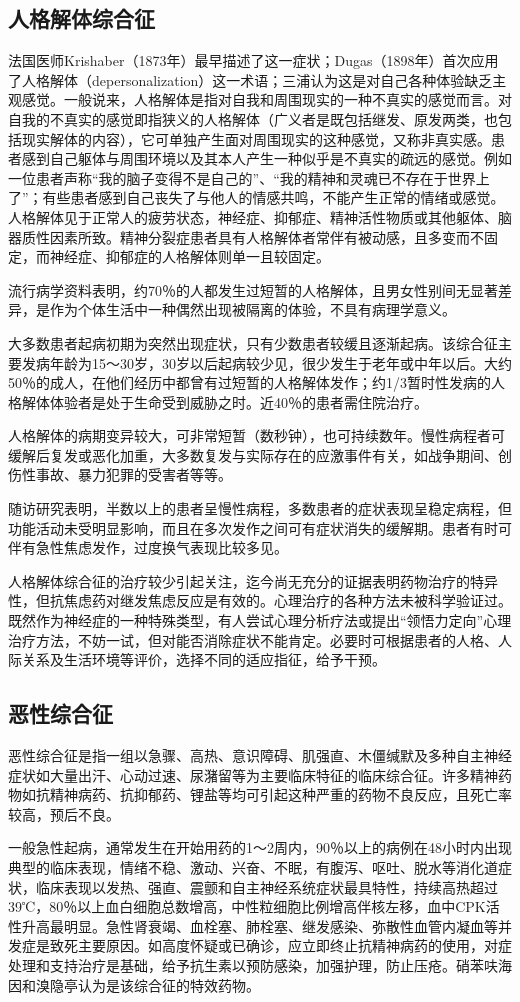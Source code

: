 \subsection{人格解体综合征}

法国医师Krishaber（1873年）最早描述了这一症状；Dugas（1898年）首次应用了人格解体（depersonalization）这一术语；三浦认为这是对自己各种体验缺乏主观感觉。一般说来，人格解体是指对自我和周围现实的一种不真实的感觉而言。对自我的不真实的感觉即指狭义的人格解体（广义者是既包括继发、原发两类，也包括现实解体的内容），它可单独产生面对周围现实的这种感觉，又称非真实感。患者感到自己躯体与周围环境以及其本人产生一种似乎是不真实的疏远的感觉。例如一位患者声称``我的脑子变得不是自己的''、``我的精神和灵魂已不存在于世界上了''；有些患者感到自己丧失了与他人的情感共鸣，不能产生正常的情绪或感觉。人格解体见于正常人的疲劳状态，神经症、抑郁症、精神活性物质或其他躯体、脑器质性因素所致。精神分裂症患者具有人格解体者常伴有被动感，且多变而不固定，而神经症、抑郁症的人格解体则单一且较固定。

流行病学资料表明，约70％的人都发生过短暂的人格解体，且男女性别间无显著差异，是作为个体生活中一种偶然出现被隔离的体验，不具有病理学意义。

大多数患者起病初期为突然出现症状，只有少数患者较缓且逐渐起病。该综合征主要发病年龄为15～30岁，30岁以后起病较少见，很少发生于老年或中年以后。大约50％的成人，在他们经历中都曾有过短暂的人格解体发作；约1/3暂时性发病的人格解体体验者是处于生命受到威胁之时。近40％的患者需住院治疗。

人格解体的病期变异较大，可非常短暂（数秒钟），也可持续数年。慢性病程者可缓解后复发或恶化加重，大多数复发与实际存在的应激事件有关，如战争期间、创伤性事故、暴力犯罪的受害者等等。

随访研究表明，半数以上的患者呈慢性病程，多数患者的症状表现呈稳定病程，但功能活动未受明显影响，而且在多次发作之间可有症状消失的缓解期。患者有时可伴有急性焦虑发作，过度换气表现比较多见。

人格解体综合征的治疗较少引起关注，迄今尚无充分的证据表明药物治疗的特异性，但抗焦虑药对继发焦虑反应是有效的。心理治疗的各种方法未被科学验证过。既然作为神经症的一种特殊类型，有人尝试心理分析疗法或提出``领悟力定向''心理治疗方法，不妨一试，但对能否消除症状不能肯定。必要时可根据患者的人格、人际关系及生活环境等评价，选择不同的适应指征，给予干预。

\subsection{恶性综合征}

恶性综合征是指一组以急骤、高热、意识障碍、肌强直、木僵缄默及多种自主神经症状如大量出汗、心动过速、尿潴留等为主要临床特征的临床综合征。许多精神药物如抗精神病药、抗抑郁药、锂盐等均可引起这种严重的药物不良反应，且死亡率较高，预后不良。

一般急性起病，通常发生在开始用药的1～2周内，90％以上的病例在48小时内出现典型的临床表现，情绪不稳、激动、兴奋、不眠，有腹泻、呕吐、脱水等消化道症状，临床表现以发热、强直、震颤和自主神经系统症状最具特性，持续高热超过39℃，80％以上血白细胞总数增高，中性粒细胞比例增高伴核左移，血中CPK活性升高最明显。急性肾衰竭、血栓塞、肺栓塞、继发感染、弥散性血管内凝血等并发症是致死主要原因。如高度怀疑或已确诊，应立即终止抗精神病药的使用，对症处理和支持治疗是基础，给予抗生素以预防感染，加强护理，防止压疮。硝苯呋海因和溴隐亭认为是该综合征的特效药物。